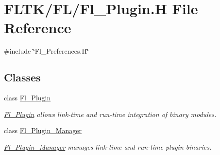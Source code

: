 \hypertarget{_fl___plugin_8_h}{}\section{F\+L\+T\+K/\+F\+L/\+Fl\+\_\+\+Plugin.H File Reference}
\label{_fl___plugin_8_h}
{\ttfamily \#include \char`\"{}Fl\+\_\+\+Preferences.\+H\char`\"{}}\newline
\subsection*{Classes}
\begin{DoxyCompactItemize}
\item 
class \hyperlink{class_fl___plugin}{Fl\+\_\+\+Plugin}
\begin{DoxyCompactList}\small\item\em \hyperlink{class_fl___plugin}{Fl\+\_\+\+Plugin} allows link-\/time and run-\/time integration of binary modules. \end{DoxyCompactList}\item 
class \hyperlink{class_fl___plugin___manager}{Fl\+\_\+\+Plugin\+\_\+\+Manager}
\begin{DoxyCompactList}\small\item\em \hyperlink{class_fl___plugin___manager}{Fl\+\_\+\+Plugin\+\_\+\+Manager} manages link-\/time and run-\/time plugin binaries. \end{DoxyCompactList}\end{DoxyCompactItemize}
